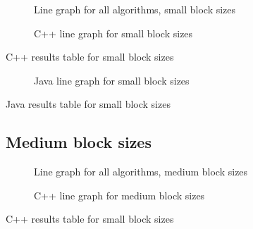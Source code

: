 \begin{figure}
    \centering
    
    \caption{Line graph for all algorithms, small block sizes}
    \label{fig:all:line:small}
\end{figure}

\begin{figure}
    \centering
    
    \caption{C++ line graph for small block sizes}
    \label{fig:cpp:line:small}
\end{figure}
\begin{table}
    \centering
    \caption{C++ results table for small block sizes}
    \label{tab:cpp:small}
    \resizebox{\columnwidth}{!}{
        
    }
\end{table}


\begin{figure}
    \centering
    
    \caption{Java line graph for small block sizes}
    \label{fig:java:line:small}
\end{figure}
\begin{table}
    \centering
    \caption{Java results table for small block sizes}
    \label{tab:java:small}
    \resizebox{\columnwidth}{!}{
        
    }
\end{table}

\subsection{Medium block sizes}
\begin{figure}
    \centering
    
    \caption{Line graph for all algorithms, medium block sizes}
    \label{fig:all:line:medium}
\end{figure}

\begin{figure}
    \centering
    
    \caption{C++ line graph for medium block sizes}
    \label{fig:cpp:line:medium}
\end{figure}
\begin{table}
    \centering
    \caption{C++ results table for small block sizes}
    \label{tab:cpp:medium}
    \resizebox{\columnwidth}{!}{
        
    }
\end{table}


